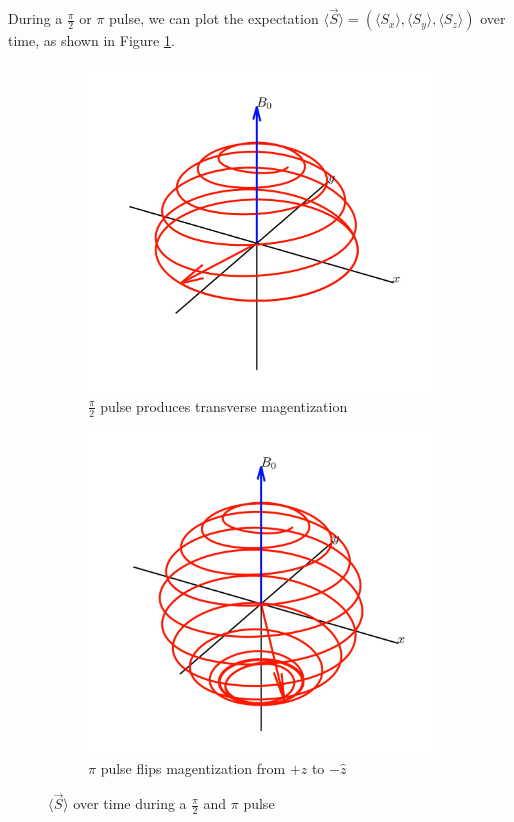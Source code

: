 \documentclass[
    floatfix,  %
    reprint,
    amsmath,amssymb,
    aps,
]{revtex4-2}
\newcommand{\halfpi}{\frac{\pi}{2}}
\begin{document}
During a $\halfpi$ or $\pi$ pulse, we can plot the expectation $\langle \vec{S} \rangle  = (\langle S_x \rangle, \langle S_y \rangle, \langle S_z \rangle)$ over time, as shown in Figure \ref{fig:pulse-spirals}.


\begin{figure}[htbp]
    \centering
    \begin{subfigure}{0.3\linewidth}
        \includegraphics[width = \linewidth]{figs/pi-2-pulse.png}
        \caption{$\halfpi$ pulse produces transverse magentization}
    \end{subfigure}
    \begin{subfigure}{0.3\linewidth}
        \includegraphics[width = \linewidth]{figs/pi-pulse.png}
        \caption{$\pi$ pulse flips magentization from $+\hat{z}$ to $-\hat{z}$}
    \end{subfigure}
    \caption{$\langle \vec{S} \rangle$ over time during a $\halfpi$ and $\pi$ pulse}\label{fig:pulse-spirals}
\end{figure}
\end{document}
